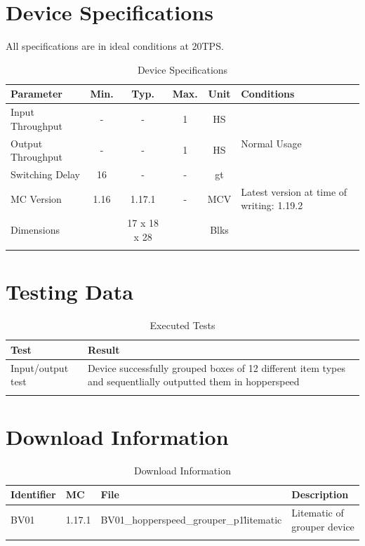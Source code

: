 \documentclass[10pt]{datasheet}
\begin{document}
\onecolumn

\section{Device Specifications}
All specifications are in ideal conditions at 20TPS.

\begin{table}[h]
\caption{Device Specifications}
\begin{tabularx}{\textwidth}{l | c c c | c | X}
    \thickhline
    \textbf{Parameter} & \textbf{Min.} & \textbf{Typ.} & \textbf{Max.} &
    \textbf{Unit} & \textbf{Conditions} \\
    \hline
    Input Throughput  & - & - & 1 & HS & \multirow{3}{*}{Normal Usage} \\
    Output Throughput  & - & - & 1 & HS & \\
    Switching Delay & 16 & - & - & gt & \\
    \hline
    MC Version & 1.16 & 1.17.1 & - & MCV & Latest version at time of writing: 1.19.2\\
    \hline
    Dimensions & & 17 x 18 x 28 & & Blks & \\
    \thickhline
\end{tabularx}
\end{table}

\section{Testing Data}
\begin{table}[h]
\caption{Executed Tests}
\begin{tabularx}{\textwidth}{X | X}
    \thickhline
    \textbf{Test} & \textbf{Result} \\
    \hline
    Input/output test & Device successfully grouped boxes of 12 different item types and sequentlially outputted them in hopperspeed\\
    \thickhline
\end{tabularx}
\end{table}

\section{Download Information}
\begin{table}[h]
    \caption{Download Information}
    \begin{tabularx}{\textwidth}{l | l | l | X}
        \thickhline
        \textbf{Identifier} & \textbf{MC} & \textbf{File} & \textbf{Description} \\
        \hline
        BV01 & 1.17.1 & BV01\_hopperspeed\_grouper\_p1\.litematic & Litematic of grouper device \\
        \thickhline
    \end{tabularx}
\end{table}
\end{document}
